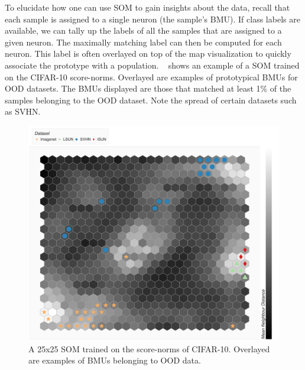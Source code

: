 To elucidate how one can use SOM to gain insights about the data, recall that each sample is assigned to a single neuron (the sample's BMU). If class labels are available, we can tally up the labels of all the samples that are assigned to a given neuron. The maximally matching label can then be computed for each neuron. This label is often overlayed on top of the map visualization to quickly associate the prototype with a population. ~ shows an example of a SOM trained on the CIFAR-10 score-norms. Overlayed are examples of prototypical BMUs for OOD datasets. The BMUs displayed are those that matched at least 1\% of the samples belonging to the OOD dataset. Note the spread of certain datasets such as SVHN.

\begin{figure}[tbhp]
\centering
\includegraphics[width=\textwidth]{figures/cifar_som_hex.png}
\caption{A 25x25 SOM trained on the score-norms of CIFAR-10. Overlayed are examples of BMUs belonging to OOD data.}
\label{fig:som-cifar}
\end{figure}





